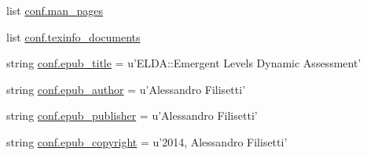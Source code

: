 \begin{DoxyCompactItemize}
\item 
list \hyperlink{a00132_a85efc5fee48a26fa2d651f6eeb38fc2b}{conf.\-man\-\_\-pages}
\item 
list \hyperlink{a00132_a54b0faed214ac92017d5689efbb10672}{conf.\-texinfo\-\_\-documents}
\item 
string \hyperlink{a00132_a9e0d62d22b83ce34deb3f16ba63cedfe}{conf.\-epub\-\_\-title} = u'E\-L\-D\-A\-::\-Emergent Levels Dynamic Assessment'
\item 
string \hyperlink{a00132_a986ebf7aa037c6bf39add300ab98a611}{conf.\-epub\-\_\-author} = u'Alessandro Filisetti'
\item 
string \hyperlink{a00132_a13c40319d84c9383e0d119773cc1ed02}{conf.\-epub\-\_\-publisher} = u'Alessandro Filisetti'
\item 
string \hyperlink{a00132_a443008520a058a726d07c6b5ccf45366}{conf.\-epub\-\_\-copyright} = u'2014, Alessandro Filisetti'
\end{DoxyCompactItemize}
